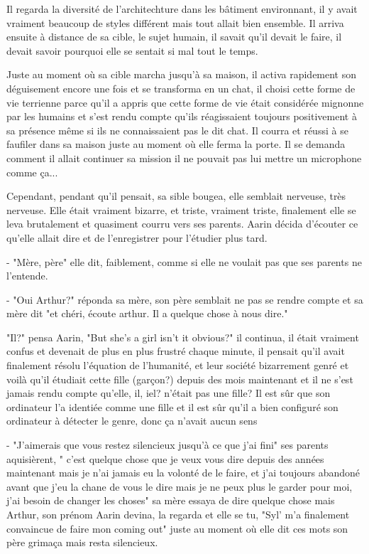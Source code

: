 \documentclass[12pt,hidelinks,a4paper]{book}
\begin{document}
Il regarda la diversité de l'architechture dans les bâtiment environnant, il y avait vraiment beaucoup de styles 
différent mais tout allait bien ensemble. Il arriva ensuite à distance de sa cible, le sujet humain, 
il savait qu'il devait le faire, il devait savoir pourquoi elle se sentait si mal tout le temps.\par 
\bigskip

Juste au moment où sa cible marcha jusqu'à sa maison, il activa rapidement son déguisement encore une fois et 
se transforma en un chat, il choisi cette forme de vie terrienne parce qu'il a appris que cette forme de vie était 
considérée mignonne par les humains et s'est rendu compte qu'ils réagissaient toujours positivement à sa présence même si ils 
ne connaissaient pas le dit chat. Il courra et réussi à se faufiler dans sa maison juste au moment où elle ferma la porte.
Il se demanda comment il allait continuer sa mission il ne pouvait pas lui mettre un microphone comme ça...\par 
\bigskip

Cependant, pendant qu'il pensait, sa sible bougea, elle semblait nerveuse, très nerveuse.
Elle était vraiment bizarre, et triste, vraiment triste, finalement elle se leva brutalement 
et quasiment courru vers ses parents. Aarin décida d'écouter ce qu'elle allait dire et de l'enregistrer pour 
l'étudier plus tard.\par 
\bigskip

- "Mère, père" elle dit, faiblement, comme si elle ne voulait pas que ses parents ne l'entende.\par
- "Oui Arthur?" réponda sa mère, son père semblait ne pas se rendre compte et sa mère dit "et chéri, écoute arthur. Il 
a quelque chose à nous dire."\par \bigskip

"Il?" pensa Aarin, "But she's a girl isn't it obvious?" il continua, il était vraiment confus et devenait de plus 
en plus frustré chaque minute, il pensait qu'il avait finalement résolu l'équation de l'humanité, et leur 
société bizarrement genré et voilà qu'il étudiait cette fille (garçon?) depuis des mois maintenant et il ne s'est 
jamais rendu compte qu'elle, il, iel? n'était pas une fille? Il est sûr que son ordinateur l'a identiée comme une fille 
et il est sûr qu'il a bien configuré son ordinateur à détecter le genre, donc ça n'avait aucun sens\par 
\bigskip
- "J'aimerais que vous restez silencieux jusqu'à ce que j'ai fini" ses parents aquisièrent, 
" c'est quelque chose que je veux vous dire depuis des années maintenant mais je n'ai jamais eu la volonté de le faire,
et j'ai toujours abandoné avant que j'eu la chane de vous le dire mais je ne peux plus le garder pour moi, j'ai 
besoin de changer les choses" sa mère essaya de dire quelque chose mais Arthur, son prénom Aarin devina, la regarda et elle 
se tu, "Syl' m'a finalement convaincue de faire mon coming out" juste au moment où elle dit ces mots son père grimaça 
mais resta silencieux.\par \bigskip 
\end{document}
